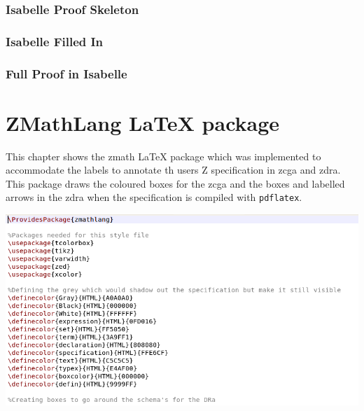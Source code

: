 \subsection{Isabelle Proof Skeleton}
\label{app:sb4}
\begin{multicols}{2}
\end{multicols}

\subsection{Isabelle Filled In}
\label{app:sb5}
\begin{multicols}{2}
\end{multicols}

\subsection{Full Proof in Isabelle}
\label{app:sb6}
\begin{multicols}{2}
\end{multicols}

\chapter{ZMathLang \LaTeX{} package}
\label{app:zmathlatex}

This chapter shows the \gls{zmath} \LaTeX{} package which was implemented to accommodate the labels to annotate th users Z specification in \gls{zcga} and \gls{zdra}. This package draws the coloured boxes for the \gls{zcga} and the boxes and labelled arrows in the \gls{zdra} when the specification is compiled with \texttt{pdflatex}.

\noindent \includegraphics[scale=0.5]{Figures/appendix/zmatha.png}

